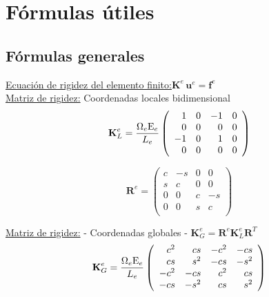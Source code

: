 \newcommand{\mE}{{\rm E}}
\newcommand{\mG}{{\rm G}}

\chapter{Fórmulas útiles}

\section{Fórmulas generales}

\begin{center}
\end{center}

\underline{
	Ecuación de rigidez del elemento finito:}\quad $\textbf{K}^e \,\textbf{u}^e = \textbf{f}^e$\\

\underline{
	Matriz de rigidez:} Coordenadas locales bidimensional
%
\vspace{-0.3cm}
$$
\textbf{K}_ L^e= %
\frac{\Omega_e\mE_e}{L_e}
\left(
\begin{array}{rrrr}
1  & 0 & -1 & 0 \\
0  & 0 &  0 & 0 \\
-1 & 0 &  1 & 0 \\
0  & 0 &  0 & 0 \\
\end{array}
\right)
$$

$$
\textbf{R}^e = %
\left(
\begin{array}{rrrr}
c  & -s &  0 & 0 \\
s  & c &  0 & 0 \\
0  & 0 &  c & -s \\
0  & 0 & s & c \\
\end{array}
\right)
$$

\underline{
	Matriz de rigidez:} - Coordenadas globales - $\textbf{K}_ G^e=\textbf{R}^e \textbf{K}_ L^e\textbf{R}^T$
\vspace{-0.3cm}
$$
\textbf{K}_ G^e= %
\frac{\Omega_e\mE_e}{L_e}
\left(
\begin{array}{rrrr}
c^2  & cs   & -c^2 &  -cs \\
cs  & s^2  &  -cs & -s^2 \\
-c^2  & -cs  &  c^2 &   cs \\
-cs  & -s^2 &   cs &  s^2 \\
\end{array}
\right)
$$

